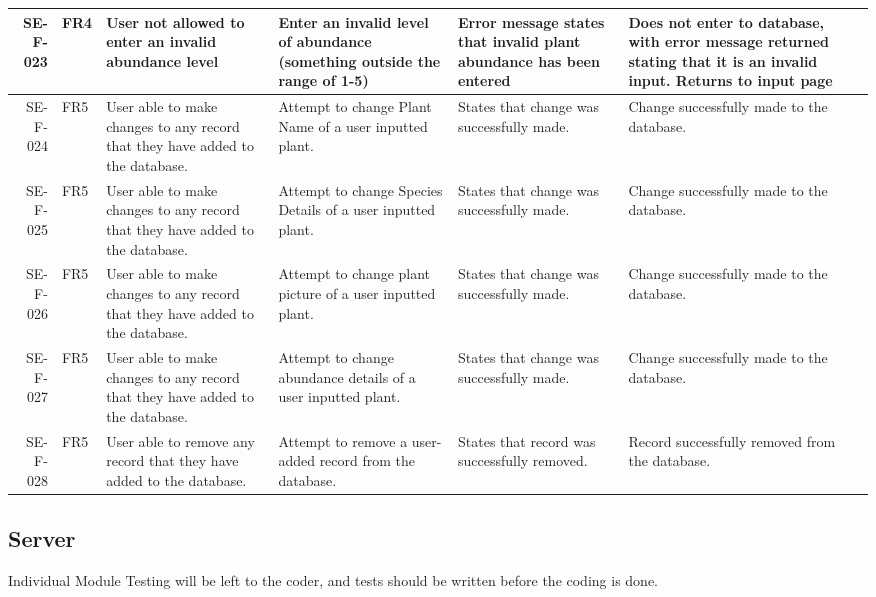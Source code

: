 \begin{landscape}
\begin{longtable}{|r|l|p{4cm}|p{4cm}|p{4cm}|p{4cm}|l|}
		SE-F-023 & FR4 & User not allowed to enter an invalid abundance level & Enter an invalid level of abundance (something outside the range of 1-5) & Error message states that invalid plant abundance has been entered & Does not enter to database, with error message returned stating that it is an invalid input. Returns to input page & \\ \hline
		SE-F-024 & FR5 & User able to make changes to any record that they have added to the database. & Attempt to change Plant Name of a user inputted plant. & States that change was successfully made. & Change successfully made to the database. & \\ \hline
		SE-F-025 & FR5 & User able to make changes to any record that they have added to the database. & Attempt to change Species Details of a user inputted plant. & States that change was successfully made. & Change successfully made to the database. & \\ \hline
		SE-F-026 & FR5 & User able to make changes to any record that they have added to the database. & Attempt to change plant picture of a user inputted plant. & States that change was successfully made. & Change successfully made to the database. & \\ \hline
		SE-F-027 & FR5 & User able to make changes to any record that they have added to the database. & Attempt to change abundance details of a user inputted plant. & States that change was successfully made. & Change successfully made to the database. & \\ \hline
		SE-F-028 & FR5 & User able to remove any record that they have added to the database. & Attempt to remove a user-added record from the database. & States that record was successfully removed. & Record successfully removed from the database. & \\ \hline
		\end{longtable}
	\end{landscape}

\subsection{Server}
	Individual Module Testing will be left to the coder, and tests should be written before the coding is done.


